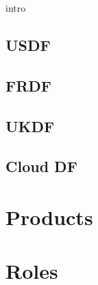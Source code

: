  {intro}






\subsection{USDF}
\subsection{FRDF}
\subsection{UKDF}
\subsection{Cloud DF}

\section{Products}

\section{Roles}

